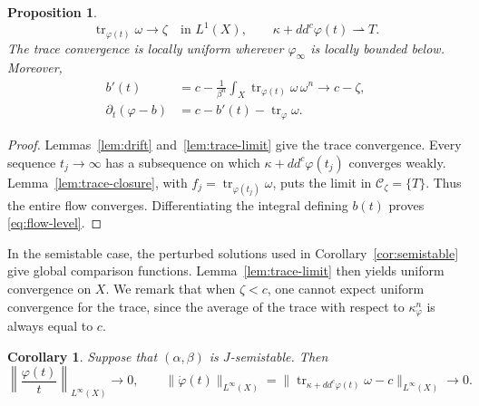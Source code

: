 \documentclass[reqno]{amsart}
\numberwithin{equation}{section}
\newtheorem{proposition}[theorem]{Proposition}
\newtheorem{corollary}[theorem]{Corollary}
\theoremstyle{definition}
\DeclareMathOperator{\tr}{tr}
\newcommand{\ddc}{dd^c}
\begin{document}
\begin{proposition}\label{prop:flow-weak}
\begin{equation}\label{eq:flow-weak}
 \tr_{\varphi(t)}\omega\longrightarrow\zeta
       \quad\text{in }L^1(X),\qquad
 \kappa+\ddc\varphi(t)\rightharpoonup T.
\end{equation}
The trace convergence is locally uniform wherever $\varphi_\infty$
is locally bounded below. Moreover,
\begin{equation}\label{eq:flow-level}
 \begin{aligned}
 b'(t)&=c-\frac1{\beta^n}
            \int_X\tr_{\varphi(t)}\omega\,\omega^n
          \longrightarrow c-\zeta,\\
 \partial_t(\varphi-b)
   &=c-b'(t)-\tr_{\varphi}\omega.
 \end{aligned}
\end{equation}
\end{proposition}
\begin{proof}
Lemmas~\ref{lem:drift} and~\ref{lem:trace-limit} give the trace
convergence. Every sequence $t_j\to\infty$
has a subsequence on which $\kappa+\ddc\varphi(t_j)$ converges weakly.
Lemma~\ref{lem:trace-closure}, with
$f_j=\tr_{\varphi(t_j)}\omega$, puts the limit in
$\mathcal C_\zeta=\{T\}$. Thus the entire flow converges.
Differentiating the integral defining $b(t)$ proves
\eqref{eq:flow-level}.
\end{proof}
In the semistable case, the perturbed solutions used in
Corollary~\ref{cor:semistable} give global comparison functions.
Lemma~\ref{lem:trace-limit} then yields uniform convergence on $X$. We remark that when $\zeta<c$, one cannot expect uniform  convergence for the trace, since the average of the trace with respect to $\kappa_\varphi^n$ is always equal to $c$. 
\begin{corollary}\label{cor:uniform-trace}
Suppose that $(\alpha,\beta)$ is $J$-semistable. Then
\begin{equation}\label{eq:uniform-trace}
 \left\|\frac{\varphi(t)}t\right\|_{L^\infty(X)}\longrightarrow0,
 \qquad
 \|\dot\varphi(t)\|_{L^\infty(X)}
 =\|\tr_{\kappa+\ddc\varphi(t)}\omega-c\|_{L^\infty(X)}
 \longrightarrow0.
\end{equation}
\end{corollary}
\end{document}
